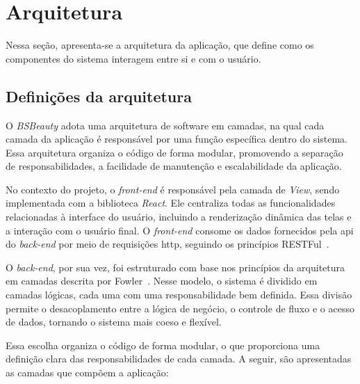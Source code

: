 \section{Arquitetura}

Nessa seção, apresenta-se a arquitetura da aplicação, que define como os componentes do sistema interagem entre si e com o usuário.

\subsection{Definições da arquitetura}

O \emph{BSBeauty} adota uma arquitetura de software em camadas, na qual cada camada da aplicação é responsável por uma função específica dentro do sistema. Essa arquitetura organiza o código de forma modular, promovendo a separação de responsabilidades, a facilidade de manutenção e escalabilidade da aplicação.

No contexto do projeto, o \emph{front-end} é responsável pela camada de \emph{View}, sendo implementada com a biblioteca \emph{React}. Ele centraliza todas as funcionalidades relacionadas à interface do usuário, incluindo a renderização dinâmica das telas e a interação com o usuário final. O \emph{front-end} consome os dados fornecidos pela \gls{api} do \emph{back-end} por meio de requisições \gls{http}, seguindo os princípios RESTFul~\cite{RESTArch}.

O \emph{back-end}, por sua vez, foi estruturado com base nos princípios da arquitetura em camadas descrita por Fowler~\cite{FowlerPatterns}. Nesse modelo, o sistema é dividido em camadas lógicas, cada uma com uma responsabilidade bem definida. Essa divisão permite o desacoplamento entre a lógica de negócio, o controle de fluxo e o acesso de dados, tornando o sistema mais coeso e flexível. 

Essa escolha organiza o código de forma modular, o que proporciona uma definição clara das responsabilidades de cada camada. A seguir, são apresentadas as camadas que compõem a aplicação:

